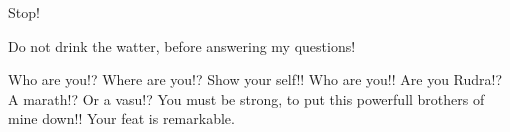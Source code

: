 Stop!

Do not drink the watter, before answering my questions!

Who are you!? Where are you!? Show your self!! Who are you!! Are you Rudra!? A marath!? Or a vasu!?
You must be strong, to put this powerfull brothers of mine down!! Your feat is remarkable.